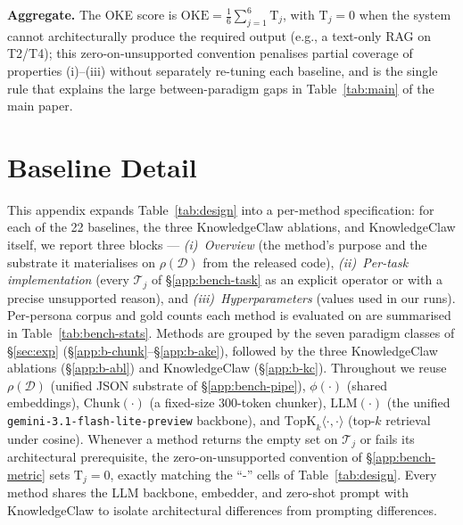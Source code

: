 \documentclass{article}
\begin{document}
\noindent\textbf{Aggregate.} The OKE score is $\mathrm{OKE}\!=\!\tfrac{1}{6}\!\sum_{j=1}^{6}\mathrm{T}_j$, with $\mathrm{T}_j\!=\!0$ when the system cannot architecturally produce the required output (e.g., a text-only RAG on T2/T4); this zero-on-unsupported convention penalises partial coverage of properties (i)--(iii) without separately re-tuning each baseline, and is the single rule that explains the large between-paradigm gaps in Table~\ref{tab:main} of the main paper.
\clearpage

\section{Baseline Detail}\label{app:baseline}

This appendix expands Table~\ref{tab:design} into a per-method specification: for each of the 22 baselines, the three KnowledgeClaw ablations, and KnowledgeClaw itself, we report three blocks --- \emph{(i)~Overview} (the method's purpose and the substrate it materialises on $\rho(\mathcal{D})$ from the released code), \emph{(ii)~Per-task implementation} (every $\mathcal{T}_j$ of \S\ref{app:bench-task} as an explicit operator or with a precise unsupported reason), and \emph{(iii)~Hyperparameters} (values used in our runs). Per-persona corpus and gold counts each method is evaluated on are summarised in Table~\ref{tab:bench-stats}. Methods are grouped by the seven paradigm classes of \S\ref{sec:exp} (\S\ref{app:b-chunk}--\S\ref{app:b-ake}), followed by the three KnowledgeClaw ablations (\S\ref{app:b-abl}) and KnowledgeClaw (\S\ref{app:b-kc}). Throughout we reuse $\rho(\mathcal{D})$ (unified JSON substrate of \S\ref{app:bench-pipe}), $\phi(\cdot)$ (shared embeddings), $\mathrm{Chunk}(\cdot)$ (a fixed-size $300$-token chunker), $\mathrm{LLM}(\cdot)$ (the unified \texttt{gemini-3.1-flash-lite-preview} backbone), and $\mathrm{TopK}_{k}\!\langle\cdot,\cdot\rangle$ (top-$k$ retrieval under cosine). Whenever a method returns the empty set on $\mathcal{T}_j$ or fails its architectural prerequisite, the zero-on-unsupported convention of \S\ref{app:bench-metric} sets $\mathrm{T}_j\!=\!0$, exactly matching the ``-'' cells of Table~\ref{tab:design}. Every method shares the LLM backbone, embedder, and zero-shot prompt with KnowledgeClaw to isolate architectural differences from prompting differences.
\end{document}
